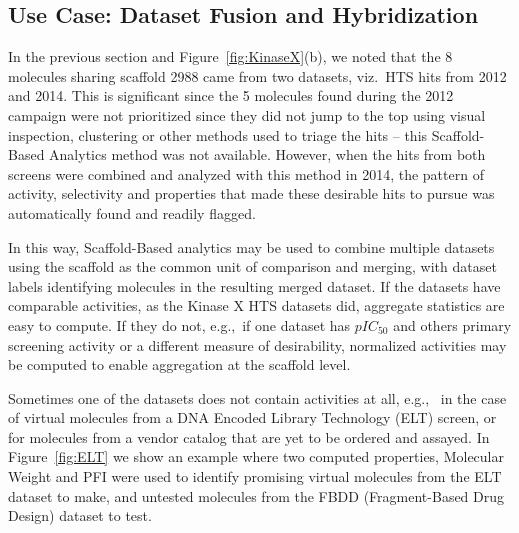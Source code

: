 \documentclass[journal=jacsat,manuscript=article]{achemso}
\newcommand*\fref[1]{Figure~\ref{fig:#1}}
\newcommand*\eg{e.g.,~}
\newcommand*\viz{viz.~}
\begin{document}
\subsection{Use Case: Dataset Fusion and Hybridization}
In the previous section and \fref{KinaseX}(b), we noted that the 8 molecules sharing scaffold 2988 came from two datasets, \viz HTS hits from 2012 and 2014. This is significant since the 5 molecules found during the 2012 campaign were not prioritized since they did not jump to the top using visual inspection, clustering or other methods used to triage the hits -- this Scaffold-Based Analytics method was not available. However, when the hits from both screens were combined and analyzed with this method in 2014, the pattern of activity, selectivity and properties that made these desirable hits to pursue was automatically found and readily flagged.

In this way, Scaffold-Based analytics may be used to combine multiple datasets using the scaffold as the common unit of comparison and merging, with dataset labels identifying molecules in the resulting merged dataset. If the datasets have comparable activities, as the Kinase X HTS datasets did, aggregate statistics are easy to compute. If they do not, \eg if one dataset has $pIC_{50}$ and others primary screening activity or a different measure of desirability, normalized activities may be computed to enable aggregation at the scaffold level.

Sometimes one of the datasets does not contain activities at all, \eg
in the case of virtual molecules from a DNA Encoded Library Technology\cite{ELT}
(ELT) screen, or for molecules from a vendor catalog that are yet to
be ordered and assayed. In \fref{ELT} we show an example where two
computed properties, Molecular Weight and PFI were used to identify
promising virtual molecules from the ELT dataset to make, and untested
molecules from the FBDD\cite{FBDD} (Fragment-Based Drug Design) dataset to test.
\end{document}

